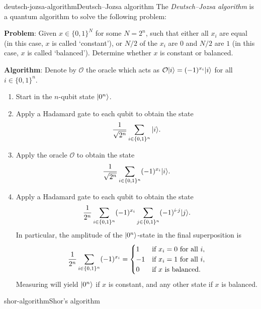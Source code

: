 \begin{topic}{deutsch-jozsa-algorithm}{Deutsch--Jozsa algorithm}
    The \emph{Deutsch--Jozsa algorithm} is a quantum algorithm to solve the following problem:
    
    \textbf{Problem}: Given $x \in \{ 0, 1 \}^N$ for some $N = 2^n$, such that either all $x_i$ are equal (in this case, $x$ is called `constant'), or $N / 2$ of the $x_i$ are $0$ and $N / 2$ are $1$ (in this case, $x$ is called `balanced'). Determine whether $x$ is constant or balanced.
    
    \textbf{Algorithm}: Denote by $\mathcal{O}$ the oracle which acts as $\mathcal{O} |i\rangle = (-1)^{x_i} |i\rangle$ for all $i \in \{ 0, 1 \}^n$.
    \begin{enumerate}[label=(\arabic*)]
        \item Start in the $n$-qubit state $|0^n\rangle$.
        \item Apply a Hadamard gate to each qubit to obtain the state
        \[ \frac{1}{\sqrt{2^n}} \sum_{i \in \{ 0, 1 \}^n } |i\rangle . \]
        \item Apply the oracle $\mathcal{O}$ to obtain the state
        \[ \frac{1}{\sqrt{2^n}} \sum_{i \in \{ 0, 1 \}^n} (-1)^{x_i} |i\rangle . \]
        \item Apply a Hadamard gate to each qubit to obtain the state
        \[ \frac{1}{2^n} \sum_{i \in \{ 0, 1 \}^n} (-1)^{x_i} \sum_{j \in \{ 0, 1 \}^n} (-1)^{i \cdot j} |j\rangle . \]
        In particular, the amplitude of the $|0^n\rangle$-state in the final superposition is
        \[ \frac{1}{2^n} \sum_{i \in \{ 0, 1 \}^n} (-1)^{x_i} = \begin{cases}
            1 & \textup{if } x_i = 0 \textup{ for all } i , \\
            -1 & \textup{if } x_i = 1 \textup{ for all } i , \\
            0 & \textup{if } x \textup{ is balanced} .
        \end{cases} \]
        Measuring will yield $|0^n\rangle$ if $x$ is constant, and any other state if $x$ is balanced.
    \end{enumerate}
\end{topic}

\begin{topic}{shor-algorithm}{Shor's algorithm}
    
\end{topic}
